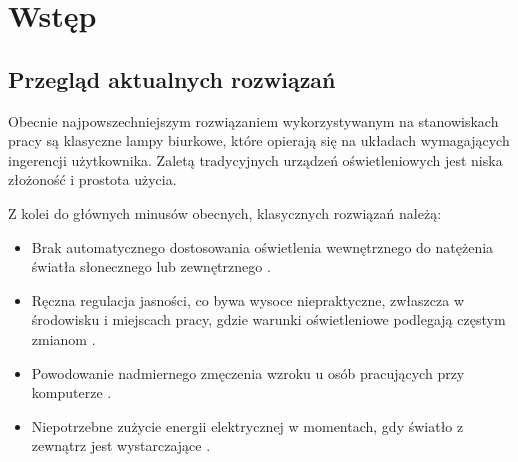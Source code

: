 \chapter{Wstęp}


\section{Przegląd aktualnych rozwiązań}

Obecnie najpowszechniejszym rozwiązaniem wykorzystywanym na stanowiskach pracy są klasyczne lampy biurkowe, które opierają się na układach wymagających ingerencji użytkownika. Zaletą tradycyjnych urządzeń oświetleniowych jest niska złożoność i prostota użycia.

Z kolei do głównych minusów obecnych, klasycznych rozwiązań należą:
\begin{itemize}
\item Brak automatycznego dostosowania oświetlenia wewnętrznego do natężenia światła słonecznego lub zewnętrznego \cite{karta_projektu}.
\item Ręczna regulacja jasności, co bywa wysoce niepraktyczne, zwłaszcza w środowisku i miejscach pracy, gdzie warunki oświetleniowe podlegają częstym zmianom \cite{karta_projektu}.
\item Powodowanie nadmiernego zmęczenia wzroku u osób pracujących przy komputerze \cite{karta_projektu}.
\item Niepotrzebne zużycie energii elektrycznej w momentach, gdy światło z zewnątrz jest wystarczające \cite{karta_projektu}.
\end{itemize}